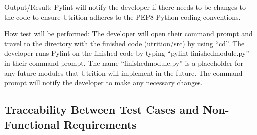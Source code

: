 \documentclass[12pt, titlepage]{article}
\begin{document}
\begin{enumerate}
		Output/Result: Pylint will notify the developer if there needs to be changes to the code to ensure Utrition adheres to the PEP8 Python coding conventions.
		
		How test will be performed: The developer will open their command prompt and travel to the directory with the finished code (utrition/src) by using “cd”. The developer runs Pylint on the finished code by typing “pylint finishedmodule.py” in their command prompt. The name “finishedmodule.py” is a placeholder for any future modules that Utrition will implement in the future. The command prompt will notify the developer to make any necessary changes.
		
		
	\end{enumerate}
	
	\subsection{Traceability Between Test Cases and Non-Functional Requirements}
	
	
\end{document}
